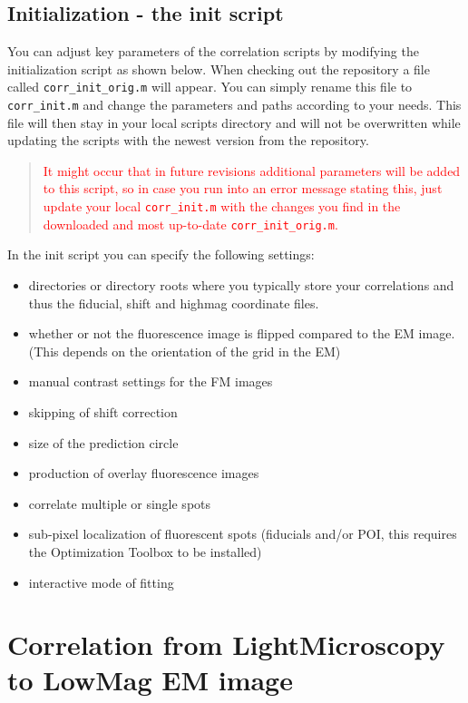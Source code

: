 \documentclass[10pt,a4paper,onepage,DIV12]{scrartcl}
\begin{document}
\newpage
\subsection{Initialization - the init script}
\label{sec:init}
You can adjust key parameters of the correlation scripts by modifying the initialization script as shown below. When checking out the repository a file called \texttt{corr\_init\_orig.m} will appear. You can simply rename this file to \texttt{corr\_init.m} and change the parameters and paths according to your needs. This file will then stay in your local scripts directory and will not be overwritten while updating the scripts with the newest version from the repository.\\

\begin{quote}\textcolor{red}{
   It might occur that in future revisions additional parameters will be added to this script, so in case you run into an error message stating this, just update your local \texttt{corr\_init.m} with the changes you find in the downloaded and most up-to-date \texttt{corr\_init\_orig.m}.}
 \end{quote}

In the init script you can specify the following settings:
\begin{itemize}
 \item directories or directory roots where you typically store your correlations and thus the fiducial, shift and highmag coordinate files.
 \item whether or not the fluorescence image is flipped compared to the EM image. (This depends on the orientation of the grid in the EM)
 \item manual contrast settings for the FM images
 \item skipping of shift correction
 \item size of the prediction circle
 \item production of overlay fluorescence images
 \item correlate multiple or single spots
 \item sub-pixel localization of fluorescent spots (fiducials and/or POI, this requires the Optimization Toolbox to be installed)
 \item interactive mode of fitting
\end{itemize}


\newpage
 
\newpage
\section{Correlation from LightMicroscopy to LowMag EM image}
\end{document}
